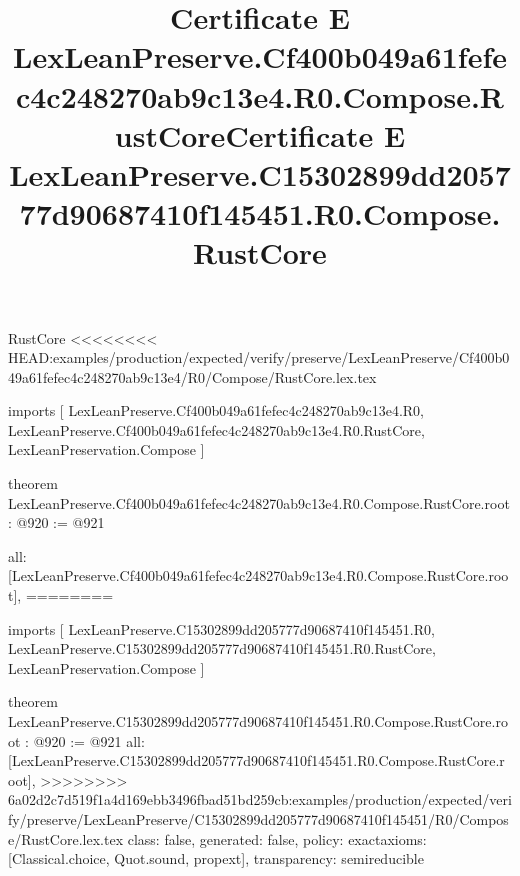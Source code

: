 \begin{lexlean}{RustCore}
<<<<<<<< HEAD:examples/production/expected/verify/preserve/LexLeanPreserve/Cf400b049a61fefec4c248270ab9c13e4/R0/Compose/RustCore.lex.tex
\title{Certificate E LexLeanPreserve.Cf400b049a61fefec4c248270ab9c13e4.R0.Compose.RustCore}
\begin{coremodule}
imports [
  LexLeanPreserve.Cf400b049a61fefec4c248270ab9c13e4.R0,
  LexLeanPreserve.Cf400b049a61fefec4c248270ab9c13e4.R0.RustCore,
  LexLeanPreservation.Compose
]

theorem LexLeanPreserve.Cf400b049a61fefec4c248270ab9c13e4.R0.Compose.RustCore.root : @920 := @921 {
  all: [LexLeanPreserve.Cf400b049a61fefec4c248270ab9c13e4.R0.Compose.RustCore.root],
========
\title{Certificate E LexLeanPreserve.C15302899dd205777d90687410f145451.R0.Compose.RustCore}
\begin{coremodule}
imports [
  LexLeanPreserve.C15302899dd205777d90687410f145451.R0,
  LexLeanPreserve.C15302899dd205777d90687410f145451.R0.RustCore,
  LexLeanPreservation.Compose
]

theorem LexLeanPreserve.C15302899dd205777d90687410f145451.R0.Compose.RustCore.root : @920 := @921 {
  all: [LexLeanPreserve.C15302899dd205777d90687410f145451.R0.Compose.RustCore.root],
>>>>>>>> 6a02d2c7d519f1a4d169ebb3496fbad51bd259cb:examples/production/expected/verify/preserve/LexLeanPreserve/C15302899dd205777d90687410f145451/R0/Compose/RustCore.lex.tex
  class: false,
  generated: false,
  policy: exact{axioms: [Classical.choice, Quot.sound, propext]},
  transparency: semireducible
}


\end{coremodule}}
\end{coremodule}
\end{lexlean}
